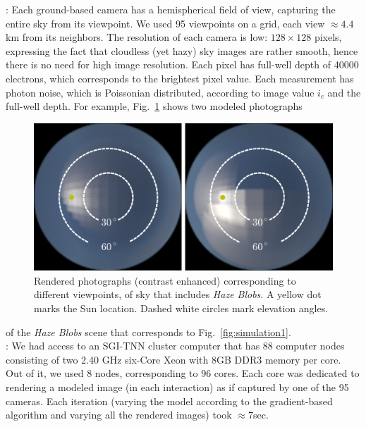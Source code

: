 \documentclass[10pt,twocolumn,letterpaper]{article}
\newcommand{\yoavcomment}[1]{}
\renewcommand{\yoavcomment}[1]{#1} %
\begin{document}
: Each ground-based camera has a hemispherical field of view, capturing the entire sky from its viewpoint. We used 95 viewpoints on a grid, each view $\approx 4.4$km from its neighbors.
The resolution of each camera is low: $128\times 128$ pixels, expressing the fact that cloudless (yet hazy) sky images are rather smooth, hence there is no need for high image resolution. Each pixel has full-well depth of 40000 electrons, which corresponds to the brightest pixel value. Each measurement has photon noise, which is Poissonian distributed, according to image value $i_c$ and the full-well depth. For example, Fig.~\ref{fig:simulation-results1} shows two modeled photographs 
\begin{figure}
  \centering
  \yoavcomment{\includegraphics[width=\columnwidth]{images/ref_images.pdf}}
  \caption{\small Rendered photographs (contrast enhanced) corresponding
   to different viewpoints, of sky that includes {\em Haze Blobs}. A yellow dot marks
    the Sun location. Dashed white circles mark elevation angles.}
  \label{fig:simulation-results1}
\end{figure}
of the  {\em Haze Blobs} scene that corresponds to Fig.~\ref{fig:simulation1}.\\



: We had access to an SGI-TNN cluster computer that has 88 computer nodes consisting of two 2.40 GHz six-Core Xeon with 8GB
DDR3 memory per core. Out of it, we used 8 nodes, corresponding to 96 cores. Each core was dedicated to rendering a modeled image (in each interaction) as if captured by one of the 95 cameras. Each iteration (varying the model according to the gradient-based algorithm and varying all the rendered images) took $\approx 7$sec.\\
\end{document}
